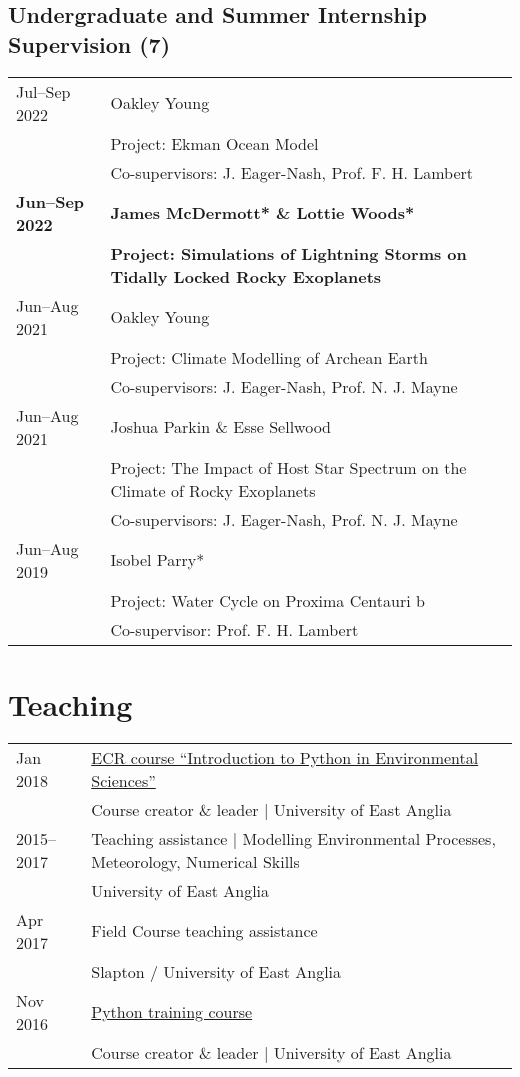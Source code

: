 \documentclass[a4paper, 11pt]{article}
\newcommand{\highlightbold}[1]{\textbf{\textcolor{exeter_bright_green}{#1}}}
\begin{document}
\subsection*{Undergraduate and Summer Internship Supervision (7)}
\begin{tabularx}{\linewidth}{@{}l X@{}}
Jul--Sep 2022 & Oakley Young \\
              & Project: Ekman Ocean Model \\
              & Co-supervisors: J. Eager-Nash, Prof. F. H. Lambert \\
\highlightbold{Jun--Sep 2022} & \highlightbold{James McDermott* \& Lottie Woods*} \\
                          & \highlightbold{Project: Simulations of Lightning Storms on Tidally Locked Rocky Exoplanets} \\
Jun--Aug 2021 & Oakley Young \\
              & Project: Climate Modelling of Archean Earth \\
              & Co-supervisors: J. Eager-Nash, Prof. N. J. Mayne \\
Jun--Aug 2021 & Joshua Parkin \& Esse Sellwood \\
              & Project: The Impact of Host Star Spectrum on the Climate of Rocky Exoplanets \\
              & Co-supervisors: J. Eager-Nash, Prof. N. J. Mayne \\
Jun--Aug 2019 & Isobel Parry* \\
              & Project: Water Cycle on Proxima Centauri b \\
              & Co-supervisor: Prof. F. H. Lambert \\
\end{tabularx}

\section{Teaching}
\begin{tabularx}{\linewidth}{@{}l X@{}}
Jan 2018 & \href{https://ueapy.github.io/pythoncourse2018}{ECR course ``Introduction to Python in Environmental Sciences''} \\ & Course creator \& leader | University of East Anglia \\
2015--2017 & Teaching assistance | Modelling Environmental Processes, Meteorology, Numerical Skills \\ & University of East Anglia \\
Apr 2017 & Field Course teaching assistance \\ & Slapton / University of East Anglia \\
Nov 2016 & \href{https://ueapy.github.io/enveast_python_course}{Python training course} \\ & Course creator \& leader | University of East Anglia \\
\end{tabularx}
\end{document}
